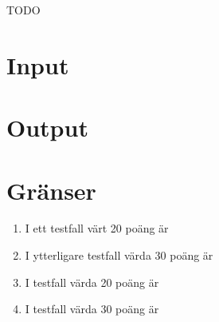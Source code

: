 
TODO

\section*{Input}

\section*{Output}

\section*{Gränser}

\begin{enumerate}
\item I ett testfall värt 20 poäng är
\item I ytterligare testfall värda 30 poäng är
\item I testfall värda 20 poäng är
\item I testfall värda 30 poäng är
\end{enumerate}

